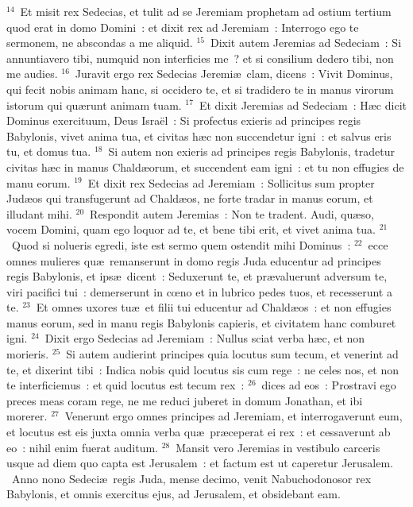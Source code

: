 ${}^{14}$~Et misit rex Sedecias, et tulit ad se Jeremiam prophetam ad ostium tertium quod erat in domo Domini~: et dixit rex ad Jeremiam~: Interrogo ego te sermonem, ne abscondas a me aliquid.
${}^{15}$~Dixit autem Jeremias ad Sedeciam~: Si annuntiavero tibi, numquid non interficies me~? et si consilium dedero tibi, non me audies.
${}^{16}$~Juravit ergo rex Sedecias Jeremi\ae\ clam, dicens~: Vivit Dominus, qui fecit nobis animam hanc, si occidero te, et si tradidero te in manus virorum istorum qui qu\ae runt animam tuam.
${}^{17}$~Et dixit Jeremias ad Sedeciam~: H\ae c dicit Dominus exercituum, Deus Isra\"el~: Si profectus exieris ad principes regis Babylonis, vivet anima tua, et civitas h\ae c non succendetur igni~: et salvus eris tu, et domus tua.
${}^{18}$~Si autem non exieris ad principes regis Babylonis, tradetur civitas h\ae c in manus Chald\ae orum, et succendent eam igni~: et tu non effugies de manu eorum.
${}^{19}$~Et dixit rex Sedecias ad Jeremiam~: Sollicitus sum propter Jud\ae os qui transfugerunt ad Chald\ae os, ne forte tradar in manus eorum, et illudant mihi.
${}^{20}$~Respondit autem Jeremias~: Non te tradent. Audi, qu\ae so, vocem Domini, quam ego loquor ad te, et bene tibi erit, et vivet anima tua.
${}^{21}$~Quod si nolueris egredi, iste est sermo quem ostendit mihi Dominus~:
${}^{22}$~ecce omnes mulieres qu\ae\ remanserunt in domo regis Juda educentur ad principes regis Babylonis, et ips\ae\ dicent~: Seduxerunt te, et pr\ae valuerunt adversum te, viri pacifici tui~: demerserunt in cœno et in lubrico pedes tuos, et recesserunt a te.
${}^{23}$~Et omnes uxores tu\ae\ et filii tui educentur ad Chald\ae os~: et non effugies manus eorum, sed in manu regis Babylonis capieris, et civitatem hanc comburet igni.
${}^{24}$~Dixit ergo Sedecias ad Jeremiam~: Nullus sciat verba h\ae c, et non morieris.
${}^{25}$~Si autem audierint principes quia locutus sum tecum, et venerint ad te, et dixerint tibi~: Indica nobis quid locutus sis cum rege~: ne celes nos, et non te interficiemus~: et quid locutus est tecum rex~:
${}^{26}$~dices ad eos~: Prostravi ego preces meas coram rege, ne me reduci juberet in domum Jonathan, et ibi morerer.
${}^{27}$~Venerunt ergo omnes principes ad Jeremiam, et interrogaverunt eum, et locutus est eis juxta omnia verba qu\ae\ pr\ae ceperat ei rex~: et cessaverunt ab eo~: nihil enim fuerat auditum.
${}^{28}$~Mansit vero Jeremias in vestibulo carceris usque ad diem quo capta est Jerusalem~: et factum est ut caperetur Jerusalem.
~Anno nono Sedeci\ae\ regis Juda, mense decimo, venit Nabuchodonosor rex Babylonis, et omnis exercitus ejus, ad Jerusalem, et obsidebant eam.
